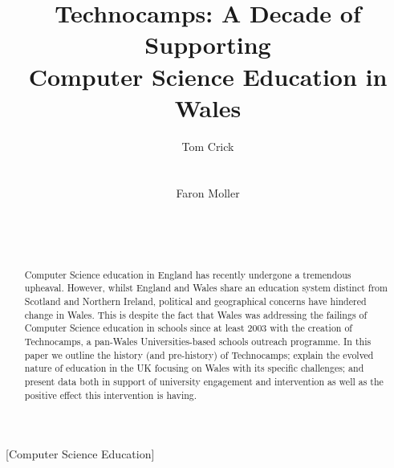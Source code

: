 \documentclass{sig-alternate}
\begin{document}
%

\title{Technocamps: A Decade of Supporting\\Computer Science Education in Wales}

\author{
\alignauthor
Tom Crick\\
\\
\\
\alignauthor
Faron Moller\\
\\
\\
\\
}

\maketitle

\begin{abstract}
Computer Science education in England has recently undergone
a tremendous upheaval.
However, whilst England and Wales share an education system distinct
from Scotland and Northern Ireland, political and geographical
concerns have hindered change in Wales.
This is despite the fact that Wales was addressing
the failings of Computer Science education in schools
since at least 2003 with the creation of Technocamps,
a pan-Wales Universities-based schools outreach programme.
In this paper we outline the history (and pre-history) of Technocamps;
explain the evolved nature of education
in the UK focusing on Wales with its specific challenges;
and present data both in support of
university engagement and intervention as well as
the positive effect this intervention is having.
\end{abstract}

[Computer Science Education]
\end{document}

